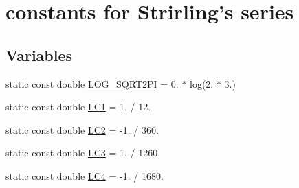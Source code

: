 \hypertarget{group__StirlingConstants}{\section{constants for \-Strirling's series}
\label{group__StirlingConstants}
}
\subsection*{\-Variables}
\begin{DoxyCompactItemize}
\item 
static const double \hyperlink{group__StirlingConstants_gabb30260352ac2c99c17ad6ba1b9eec95}{\-L\-O\-G\-\_\-\-S\-Q\-R\-T2\-P\-I} = 0. $\ast$ log(2. $\ast$ 3.)
\item 
static const double \hyperlink{group__StirlingConstants_ga281748e1c9170c319467b964e00ffdcd}{\-L\-C1} = 1. / 12.
\item 
static const double \hyperlink{group__StirlingConstants_gad40081cd1b03fabc256d282bc182600c}{\-L\-C2} = -\/1. / 360.
\item 
static const double \hyperlink{group__StirlingConstants_ga051c91b0471cbae85672657b5784240b}{\-L\-C3} = 1. / 1260.
\item 
static const double \hyperlink{group__StirlingConstants_gadd3817a2ccf5bb9c63838889236f4a5e}{\-L\-C4} = -\/1. / 1680.
\end{DoxyCompactItemize}


